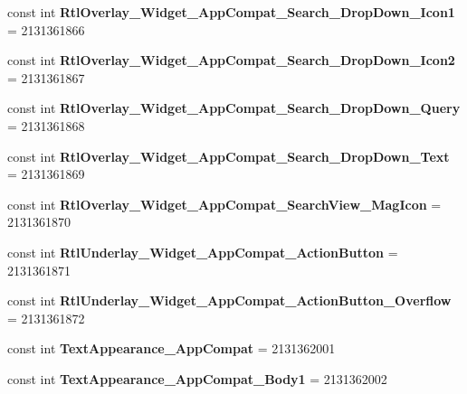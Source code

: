 \begin{DoxyCompactItemize}
const int {\bfseries Rtl\+Overlay\+\_\+\+Widget\+\_\+\+App\+Compat\+\_\+\+Search\+\_\+\+Drop\+Down\+\_\+\+Icon1} = 2131361866
\item 
\mbox{\label{classXaria_1_1Resource_1_1Style_a7b6c1d743725b97150bb3ee041fa725e}} 
const int {\bfseries Rtl\+Overlay\+\_\+\+Widget\+\_\+\+App\+Compat\+\_\+\+Search\+\_\+\+Drop\+Down\+\_\+\+Icon2} = 2131361867
\item 
\mbox{\label{classXaria_1_1Resource_1_1Style_ac1b61439df68f6341d6ee4fec760ba78}} 
const int {\bfseries Rtl\+Overlay\+\_\+\+Widget\+\_\+\+App\+Compat\+\_\+\+Search\+\_\+\+Drop\+Down\+\_\+\+Query} = 2131361868
\item 
\mbox{\label{classXaria_1_1Resource_1_1Style_aa40298964442829a04921905786ec149}} 
const int {\bfseries Rtl\+Overlay\+\_\+\+Widget\+\_\+\+App\+Compat\+\_\+\+Search\+\_\+\+Drop\+Down\+\_\+\+Text} = 2131361869
\item 
\mbox{\label{classXaria_1_1Resource_1_1Style_a7929a8ca1f8d65e5ad8e3511fa16d22a}} 
const int {\bfseries Rtl\+Overlay\+\_\+\+Widget\+\_\+\+App\+Compat\+\_\+\+Search\+View\+\_\+\+Mag\+Icon} = 2131361870
\item 
\mbox{\label{classXaria_1_1Resource_1_1Style_ad6ed97c9091a4b046a8dee7b0f757156}} 
const int {\bfseries Rtl\+Underlay\+\_\+\+Widget\+\_\+\+App\+Compat\+\_\+\+Action\+Button} = 2131361871
\item 
\mbox{\label{classXaria_1_1Resource_1_1Style_ad0f8618bd7216a97819cb9efac2c0b46}} 
const int {\bfseries Rtl\+Underlay\+\_\+\+Widget\+\_\+\+App\+Compat\+\_\+\+Action\+Button\+\_\+\+Overflow} = 2131361872
\item 
\mbox{\label{classXaria_1_1Resource_1_1Style_a994920333ef0da72326398f90d287f3a}} 
const int {\bfseries Text\+Appearance\+\_\+\+App\+Compat} = 2131362001
\item 
\mbox{\label{classXaria_1_1Resource_1_1Style_ae4c062449ebc25b52555400fd4644f28}} 
const int {\bfseries Text\+Appearance\+\_\+\+App\+Compat\+\_\+\+Body1} = 2131362002

\end{DoxyCompactItemize}

